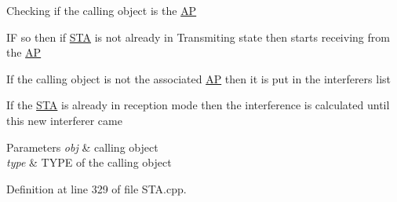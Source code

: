 \begin{DoxyEnumerate}
\item Checking if the calling object is the \hyperlink{classAP}{A\-P} \par

\item I\-F so then if \hyperlink{classSTA}{S\-T\-A} is not already in Transmiting state then starts receiving from the \hyperlink{classAP}{A\-P} \par

\item If the calling object is not the associated \hyperlink{classAP}{A\-P} then it is put in the interferers list \par

\item If the \hyperlink{classSTA}{S\-T\-A} is already in reception mode then the interference is calculated until this new interferer came \par

\begin{DoxyParams}{Parameters}
{\em obj} & calling object \\
\hline
{\em type} & T\-Y\-P\-E of the calling object \\
\hline
\end{DoxyParams}

\end{DoxyEnumerate}

Definition at line 329 of file S\-T\-A.\-cpp.


